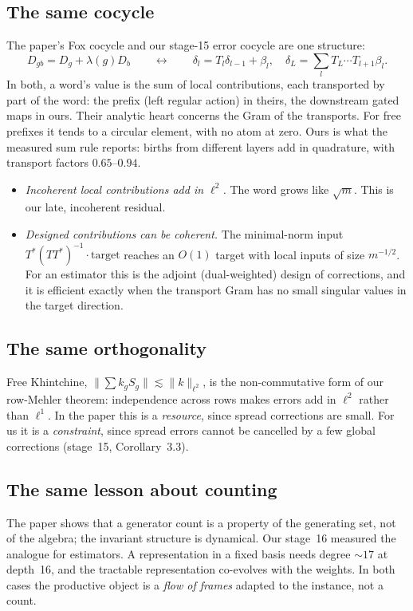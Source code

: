 \label{sec:programme}
\subsection{The same cocycle}
The paper's Fox cocycle and our stage-15 error cocycle are one structure:
\[
D_{gb}=D_g+\lambda(g)D_b\qquad\longleftrightarrow\qquad \delta_l=T_l\delta_{l-1}+\beta_l,\quad \delta_L=\sum_lT_L\cdots T_{l+1}\beta_l .
\]
In both, a word's value is the sum of local contributions, each transported by part of the word: the prefix (left regular action) in theirs, the
downstream gated maps in ours. Their analytic heart concerns the Gram of the transports. For free prefixes it tends to a circular element,
with no atom at zero. Ours is what the measured sum rule reports: births from different layers add in quadrature, with transport factors $0.65$--$0.94$.
\begin{itemize}[leftmargin=*]
\item \emph{Incoherent local contributions add in $\ell^2$.} The word grows like $\sqrt m$. This is our late, incoherent residual.
\item \emph{Designed contributions can be coherent.} The minimal-norm input $T^*(TT^*)^{-1}\cdot\mathrm{target}$ reaches an $O(1)$ target with local inputs of size $m^{-1/2}$.
For an estimator this is the adjoint (dual-weighted) design of corrections, and it is efficient exactly when the transport Gram has no small
singular values in the target direction.
\end{itemize}

\subsection{The same orthogonality}
Free Khintchine, $\|\sum k_gS_g\|\lesssim\|k\|_{\ell^2}$, is the non-commutative form of our row-Mehler theorem: independence across rows makes errors add in
$\ell^2$ rather than $\ell^1$. In the paper this is a \emph{resource}, since spread corrections are small. For us it is a \emph{constraint}, since spread errors
cannot be cancelled by a few global corrections (stage~15, Corollary~3.3).

\subsection{The same lesson about counting}
The paper shows that a generator count is a property of the generating set, not of the algebra; the invariant structure is dynamical. Our
stage~16 measured the analogue for estimators. A representation in a fixed basis needs degree $\sim17$ at depth~16, and the tractable
representation co-evolves with the weights. In both cases the productive object is a \emph{flow of frames} adapted to the instance, not a count.

